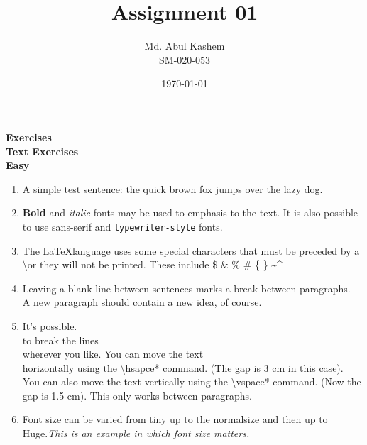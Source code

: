 \documentclass[11pt]{article}
\begin{document}
	\title{Assignment 01}
	\author{Md. Abul Kashem\\
		 SM-020-053}
	
	\date{\today}
	\maketitle
	
	\flushleft \huge \textbf{\LaTeXe Exercises}\\
	\Large \textbf{Text Exercises}\\
	\large \textbf{Easy}
	\begin{enumerate}
		\item A simple test sentence: the quick brown fox jumps over the lazy dog.
		
		\item \textbf{Bold} and \textit{italic} fonts may be used to emphasis to the text. It is also possible to use \textsf{sans-serif} and \texttt{typewriter-style} fonts.
		
		\item The \LaTeX language uses some special characters that must be preceded by a \textbackslash or they will not be printed. These include \$ \& \% \# \{ \} \textasciitilde \textasciicircum 
		
		\item Leaving a blank line between sentences marks a break between paragraphs. \\
		A new paragraph should contain a new idea, of course. 
		
		\item It's possible.\\
		to break the lines\\
		wherever you like. You can move the text\\
		\hspace*{3 cm}horizontally using the \textbackslash hsapce* command. (The gap is 3 cm in this case).\vspace*{1.5 cm} \\
		You can also move the text vertically using the \textbackslash vspace* command. (Now the gap is 1.5 cm). This only works between paragraphs.
		
		\item Font size can be varied from \tiny tiny \scriptsize up \footnotesize to \small the \normalsize normalsize \large and \Large then \LARGE up \huge to \Huge Huge.\normalsize \textit{This is an example in which font size matters.} 
	\end{enumerate}
	
\end{document}
